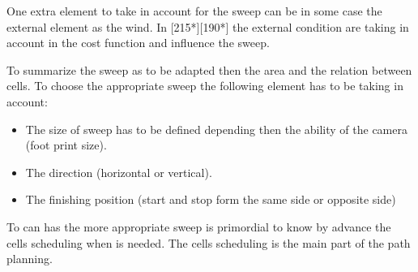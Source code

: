 	One extra element to take in account for the sweep can be in some case the external element as the wind. In [215*][190*] the external condition are taking in account in the cost function and influence the sweep.
	
	
	To summarize the sweep as to be adapted then the area and the relation between cells. To choose the appropriate sweep the following element has to be taking in account:
	\begin{itemize}
		\item The size of  sweep  has to be defined depending then the ability of the camera (foot print size).
		\item The direction (horizontal or vertical).
		\item The finishing  position (start and stop form the same side or opposite side)
	\end{itemize}
To  can has the more appropriate sweep is primordial to know by advance  the cells scheduling when is needed. The cells scheduling is the main part of the path planning.

	
	 

	 
	
	
    
